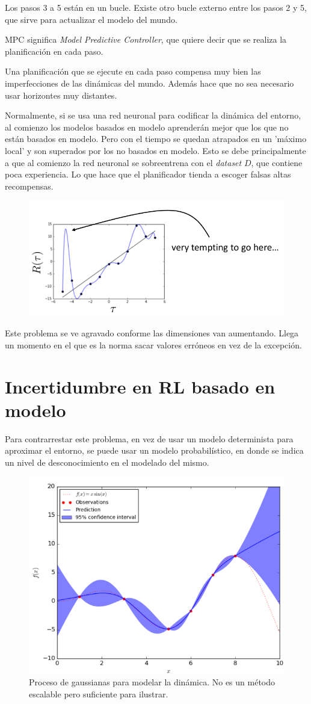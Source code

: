 Los pasos 3 a 5 están en un bucle. Existe otro bucle externo entre los pasos 2 y 5, que sirve
para actualizar el modelo del mundo.

MPC significa \textit{Model Predictive Controller}, que quiere decir que se realiza la
planificación en cada paso.

Una planificación que se ejecute en cada paso compensa muy bien las imperfecciones de
las dinámicas del mundo. Además hace que no sea necesario usar horizontes muy distantes.

Normalmente, si se usa una red neuronal para codificar la dinámica del entorno, al comienzo
los modelos basados en modelo aprenderán mejor que los que no están basados en modelo. Pero con
el tiempo se quedan atrapados en un 'máximo local' y son superados por los no basados en
modelo.
Esto se debe principalmente a que al comienzo la red neuronal se sobreentrena con el
\textit{dataset} $D$, que contiene poca experiencia. Lo que hace que el planificador tienda
a escoger falsas altas recompensas.

\begin{figure}[H]
	\centering
	\includegraphics[width=0.5\linewidth]{figures/2020-06-27-171654_723x328_scrot.png}
\end{figure}

Este problema se ve agravado conforme las dimensiones van aumentando. Llega un momento en el que
es la norma sacar valores erróneos en vez de la excepción.

\section{Incertidumbre en RL basado en modelo}%
\label{sec:incertidumbre_en_rl_basado_en_modelo}

Para contrarrestar este problema, en vez de usar un modelo determinista para aproximar el
entorno, se puede usar un modelo probabilístico, en donde se indica un nivel de desconocimiento
en el modelado del mismo.

\begin{figure}[htpb]
	\centering
	\includegraphics[width=0.5\linewidth]{figures/2020-06-27-172621_637x491_scrot.png}
	\caption{Proceso de gaussianas para modelar la dinámica. No es un método escalable pero
    suficiente para ilustrar.}
\end{figure}

